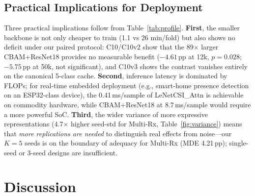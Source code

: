 \documentclass[journal,11pt]{IEEEtran}
\begin{document}
\subsection{Practical Implications for Deployment}
Three practical implications follow from Table~\ref{tab:profile}. \textbf{First}, the smaller backbone is not only cheaper to train (1.1 vs 26 min/fold) but also shows no deficit under our paired protocol: C10/C10v2 show that the 89$\times$ larger CBAM+ResNet18 provides no measurable benefit ($-4.61$\,pp at 12k, $p = 0.028$; $-5.75$\,pp at 50k, not significant), and C10v3 shows the contrast vanishes entirely on the canonical 5-class cache. \textbf{Second}, inference latency is dominated by FLOPs; for real-time embedded deployment (e.g., smart-home presence detection on an ESP32-class device), the 0.41\,ms/sample of LeNetCSI\_Attn is achievable on commodity hardware, while CBAM+ResNet18 at 8.7\,ms/sample would require a more powerful SoC. \textbf{Third}, the wider variance of more expressive representations (4.7$\times$ higher seed-std for Multi-Rx, Table~\ref{fig:variance}) means that \emph{more replications are needed} to distinguish real effects from noise---our $K = 5$ seeds is on the boundary of adequacy for Multi-Rx (MDE 4.21\,pp); single-seed or 3-seed designs are insufficient.

\section{Discussion}
\label{sec:discussion}
\end{document}
